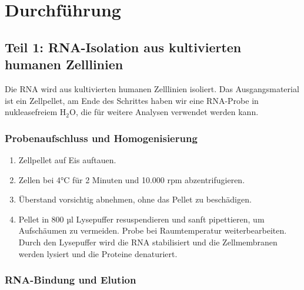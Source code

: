 \documentclass[a4paper,12pt]{article}
\begin{document}
\section*{Durchführung}

\subsection*{Teil 1: RNA-Isolation aus kultivierten humanen Zelllinien}

Die RNA wird aus kultivierten humanen Zelllinien isoliert. Das Ausgangsmaterial ist ein Zellpellet, am Ende des Schrittes haben wir eine RNA-Probe in nukleasefreiem H$_2$O, die für weitere Analysen verwendet werden kann.

\subsubsection*{Probenaufschluss und Homogenisierung}
\begin{enumerate}
    \item Zellpellet auf Eis auftauen.
    \item Zellen bei 4°C für 2 Minuten und 10.000 rpm abzentrifugieren.
    \item Überstand vorsichtig abnehmen, ohne das Pellet zu beschädigen.
    \item Pellet in 800 µl Lysepuffer resuspendieren und sanft pipettieren, um Aufschäumen zu vermeiden. Probe bei Raumtemperatur weiterbearbeiten. Durch den Lysepuffer wird die RNA stabilisiert und die Zellmembranen werden lysiert und die Proteine denaturiert.
\end{enumerate}

\subsubsection*{RNA-Bindung und Elution}
\end{document}
